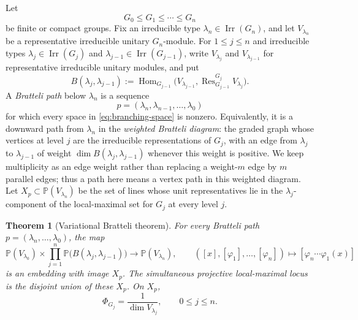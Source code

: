 \documentclass[10pt]{amsart}
\newtheorem{theorem}{Theorem}[section]
\theoremstyle{remark}
\DeclareMathOperator{\Hom}{Hom}
\DeclareMathOperator{\Res}{Res}
\newcommand{\PP}{\mathbb P}
\begin{document}
Let
\[
 G_0\leq G_1\leq\cdots\leq G_n
\]
be finite or compact groups.
Fix an irreducible type
$\lambda_n\in\operatorname{Irr}(G_n)$,
and let $V_{\lambda_n}$ be a representative
irreducible unitary $G_n$-module.
For $1\leq j\leq n$ and irreducible types
$\lambda_j\in\operatorname{Irr}(G_j)$ and
$\lambda_{j-1}\in\operatorname{Irr}(G_{j-1})$,
write $V_{\lambda_j}$ and $V_{\lambda_{j-1}}$
for representative irreducible unitary modules, and put
\begin{equation}\label{eq:branching-space}
 B(\lambda_j,\lambda_{j-1})
 :=
 \Hom_{G_{j-1}}
 \bigl(V_{\lambda_{j-1}},
       \Res^{G_j}_{G_{j-1}}V_{\lambda_j}\bigr).
\end{equation}
A \emph{Bratteli path} below $\lambda_n$ is a sequence
\[
 p=(\lambda_n,\lambda_{n-1},\ldots,\lambda_0)
\]
for which every space in \eqref{eq:branching-space} is nonzero. Equivalently, it is a downward path from
$\lambda_n$ in the \emph{weighted Bratteli diagram}: the graded graph whose vertices at level $j$ are the
irreducible representations of $G_j$, with an edge from $\lambda_j$ to $\lambda_{j-1}$ of weight
$\dim B(\lambda_j,\lambda_{j-1})$ whenever this weight is positive. We keep multiplicity as an edge
weight rather than replacing a weight-$m$ edge by $m$ parallel edges; thus a path here means a vertex path
in this weighted diagram. Let $X_p\subset\PP(V_{\lambda_n})$
be the set of lines whose unit representatives lie in the $\lambda_j$-component of the
local-maximal set for $G_j$ at every level $j$.

\begin{theorem}[Variational Bratteli theorem]\label{thm:bratteli}
For every Bratteli path
$p=(\lambda_n,\ldots,\lambda_0)$, the map
\begin{equation}\label{eq:bratteli-map}
 \PP(V_{\lambda_0})
 \times
 \prod_{j=1}^n\PP\bigl(B(\lambda_j,\lambda_{j-1})\bigr)
 \longrightarrow
 \PP(V_{\lambda_n}),
 \qquad
 ([x],[\varphi_1],\ldots,[\varphi_n])
 \longmapsto
 [\varphi_n\cdots\varphi_1(x)]
\end{equation}
is an embedding with image $X_p$. The simultaneous projective local-maximal locus is the disjoint
union of these $X_p$. On $X_p$,
\begin{equation}\label{eq:bratteli-heights}
 \Phi_{G_j}=\frac1{\dim V_{\lambda_j}},
 \qquad 0\le j\le n.
\end{equation}
\end{theorem}
\end{document}
